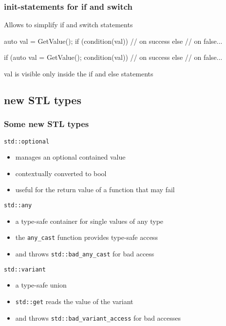 \begin{frame}[fragile]
  \frametitle{init-statements for if and switch}
  Allows to simplify if and switch statements
  \begin{alertblock}{}
    \begin{cppcode*}{}
      auto val = GetValue();
      if (condition(val)) {
        // on success
      } else {
        // on false...
      }
    \end{cppcode*}
  \end{alertblock}
  \begin{exampleblock}{}
    \begin{cppcode*}{}
      if (auto val = GetValue(); condition(val)) {
        // on success
      } else {
        // on false...
      }
    \end{cppcode*}
    \vspace{-.3cm}
    val is visible only inside the if and else statements
  \end{exampleblock}  
\end{frame}

\subsection[STL]{new STL types}

\begin{frame}[fragile]
  \frametitle{Some new STL types}
  \begin{block}{\texttt{std::optional}}
    \begin{itemize}
    \item manages an optional contained value
    \item contextually converted to bool
    \item useful for the return value of a function that may fail
    \end{itemize}
  \end{block}
  \begin{block}{\texttt{std::any}}
    \begin{itemize}
    \item a type-safe container for single values of any type
    \item the \texttt{any\_cast} function provides type-safe access
    \item and throws \texttt{std::bad\_any\_cast} for bad access
    \end{itemize}
  \end{block}
  \begin{block}{\texttt{std::variant}}
    \begin{itemize}
    \item a type-safe union
    \item \texttt{std::get} reads the value of the variant
    \item and throws \texttt{std::bad\_variant\_access} for bad accesses
    \end{itemize}
  \end{block}
\end{frame}
